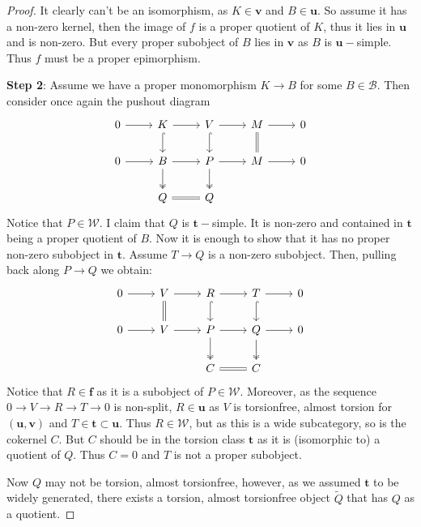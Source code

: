\documentclass[10pt,a4paper]{amsart}
\newcommand{\B}{\mathcal B}
\newcommand{\tpair}[2]{(\mathbf{#1}, \mathbf{#2})  }
\begin{document}
\begin{proof}
It clearly can't be an isomorphism, as \( K \in \mathbf{v} \) and \( B \in \mathbf{u} \). So assume it has a non-zero kernel, then the image of \( f \) is a proper quotient of \( K \), thus it lies in \( \mathbf{u} \) and is non-zero. But every proper subobject of \( B \) lies in \( \mathbf{v} \) as \( B \) is \( \mathbf{u}-\)simple. Thus \( f \) must be a proper epimorphism. 

\noindent \textbf{Step 2}: Assume we have a proper monomorphism \( K \to B \) for some \( B \in \B \). Then consider once again the pushout diagram
\[
\begin{tikzcd}
0 \ar[r] & K \ar[r] \ar[d, hook] & V \ar[r] \ar[d, hook] & M \ar[r] \ar[d, equals] & 0 \\
0 \ar[r] & B \ar[d, two heads] \ar[r] & P \ar[d, two heads] \ar[r] & M \ar[r] & 0 \\
& Q \ar[r, equals] & Q
\end{tikzcd}
\]
Notice that \( P \in \mathcal{W} \). I claim that \( Q \) is \( \mathbf{t}-\)simple. It is non-zero and contained in \( \mathbf{t} \) being a proper quotient of \( B \). Now it is enough to show that it has no proper non-zero subobject in \( \mathbf{t} \). Assume \( T \to Q \) is a non-zero subobject. Then, pulling back along \( P \to Q \) we obtain:
\[
\begin{tikzcd}
0 \ar[r] & V \ar[r] \ar[d, equals] & R \ar[r] \ar[d, hook] & T \ar[r] \ar[d, hook] & 0 \\
0 \ar[r] & V  \ar[r] & P \ar[d, two heads] \ar[r] & Q \ar[r] \ar[d, two heads] & 0 \\
& & C \ar[r, equals] & C
\end{tikzcd}
\]
Notice that \( R \in \mathbf{f} \) as it is a subobject of  \(  P \in \mathcal{W} \). Moreover, as the sequence \( 0 \to V \to R \to T \to 0 \) is non-split, \( R \in \mathbf{u} \) as \( V \) is torsionfree, almost torsion for \( \tpair{u}{v} \) and \( T \in \mathbf{t} \subset \mathbf{u} \). Thus \( R \in \mathcal{W} \), but as this is a wide subcategory, so is the cokernel \( C \). But \( C \) should be in the torsion class \( \mathbf{t} \) as it is (isomorphic to) a quotient of \( Q \). Thus \( C = 0 \) and \( T \) is not a proper subobject. 

Now \( Q \) may not be torsion, almost torsionfree, however, as we assumed \( \mathbf{t} \) to be widely generated, there exists a torsion, almost torsionfree object \( \widetilde{Q} \) that has \( Q \) as a quotient. 


\end{proof}
\end{document}
